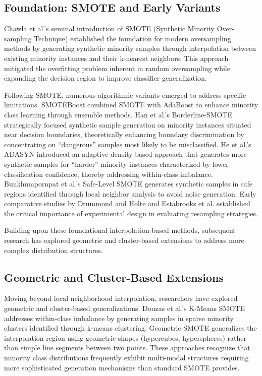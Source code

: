 \documentclass[12pt,a4paper]{article}
\theoremstyle{definition}
\begin{document}
\subsection{Foundation: SMOTE and Early Variants}
\indent Chawla et al.'s \cite{chawla2002smote} seminal introduction of SMOTE (Synthetic Minority Over-sampling Technique) established the foundation for modern oversampling methods by generating synthetic minority samples through interpolation between existing minority instances and their k-nearest neighbors. This approach mitigated the overfitting problem inherent in random oversampling while expanding the decision region to improve classifier generalization.

Following SMOTE, numerous algorithmic variants emerged to address specific limitations. SMOTEBoost \cite{chawla2003smoteboost} combined SMOTE with AdaBoost to enhance minority class learning through ensemble methods. Han et al.'s Borderline-SMOTE \cite{han2005borderline} strategically focused synthetic sample generation on minority instances situated near decision boundaries, theoretically enhancing boundary discrimination by concentrating on ``dangerous'' samples most likely to be misclassified. He et al.'s ADASYN \cite{he2008adasyn} introduced an adaptive density-based approach that generates more synthetic samples for ``harder'' minority instances characterized by lower classification confidence, thereby addressing within-class imbalance. Bunkhumpornpat et al.'s Safe-Level SMOTE \cite{bunkhumpornpat2009safe} generates synthetic samples in safe regions identified through local neighbor analysis to avoid noise generation. Early comparative studies by Drummond and Holte \cite{drummond2003c4} and Estabrooks et al. \cite{estabrooks2004multiple} established the critical importance of experimental design in evaluating resampling strategies.

Building upon these foundational interpolation-based methods, subsequent research has explored geometric and cluster-based extensions to address more complex distribution structures.

\subsection{Geometric and Cluster-Based Extensions}
\indent Moving beyond local neighborhood interpolation, researchers have explored geometric and cluster-based generalizations. Douzas et al.'s K-Means SMOTE \cite{douzas2018improving} addresses within-class imbalance by generating samples in sparse minority clusters identified through k-means clustering. Geometric SMOTE \cite{douzas2019geometric} generalizes the interpolation region using geometric shapes (hypercubes, hyperspheres) rather than simple line segments between two points. These approaches recognize that minority class distributions frequently exhibit multi-modal structures requiring more sophisticated generation mechanisms than standard SMOTE provides.
\end{document}
